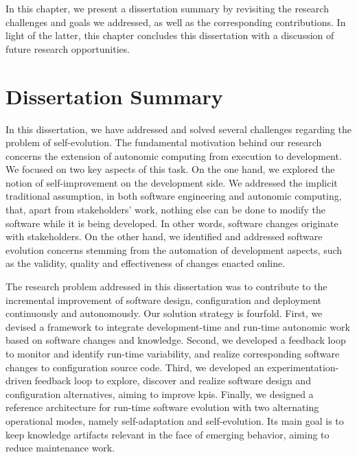\label{chapter:conclusions}

\minitoc

In this chapter, we present a dissertation summary by revisiting the research challenges and goals we addressed, as well as the corresponding contributions. In light of the latter, this chapter concludes this dissertation with a discussion of future research opportunities.

\section{Dissertation Summary}
\label{sect:conclusions--dissertation-summary}

In this dissertation, we have addressed and solved several challenges regarding the problem of self-evolution. The fundamental motivation behind our research concerns the extension of autonomic computing from execution to development. We focused on two key aspects of this task. On the one hand, we explored the notion of self-improvement on the development side. We addressed the implicit traditional assumption, in both software engineering and autonomic computing, that, apart from stakeholders’ work, nothing else can be done to modify the software while it is being developed. In other words, software changes originate with stakeholders. On the other hand, we identified and addressed software evolution concerns stemming from the automation of development aspects, such as the validity, quality and effectiveness of changes enacted online.

The research problem addressed in this dissertation was to contribute to the incremental improvement of software design, configuration and deployment continuously and autonomously. Our solution strategy is fourfold. First, we devised a framework to integrate development-time and run-time autonomic work based on software changes and knowledge. Second, we developed a feedback loop to monitor and identify run-time variability, and realize corresponding software changes to configuration source code. Third, we developed an experimentation-driven feedback loop to explore, discover and realize software design and configuration alternatives, aiming to improve \glspl{kpi}. Finally, we designed a reference architecture for run-time software evolution with two alternating operational modes, namely self-adaptation and self-evolution. Its main goal is to keep knowledge artifacts relevant in the face of emerging behavior, aiming to reduce maintenance work.

